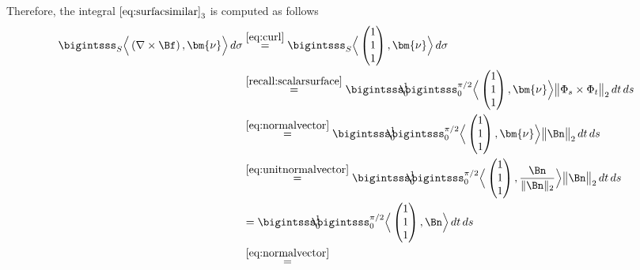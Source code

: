 \documentclass[12pt]{article}
\begin{document}
\begin{enumerate}[(i)]
	      Therefore, the integral $\eqref{eq:surfacsimilar}_{3}$
	      is computed as follows
	      \begin{align}
		      \bigintsss_{S} \Big\langle \left( \nabla \times \Bf \right), \bm{\nu} \Big\rangle \, d\sigma
		       & 
		      \stackrel{\eqref{eq:curl}}{=}
		      \bigintsss_{S} \Big\langle \begin{pmatrix} 1\\1\\1\end{pmatrix}, \bm{\nu} \Big\rangle \, d\sigma \\
		       & 
		      \stackrel{\eqref{recall:scalarsurface}}{=}
		      \bigintsss_{0}^{1} \!\!\!\!\! \bigintsss_{0}^{\pi/2}
		      \Big\langle \begin{pmatrix} 1\\1\\1\end{pmatrix}, \bm{\nu} \Big\rangle 
		      \big\| \Phi_s \times \Phi_t \big\|_2 \, dt \,ds                                                  \\
		       & 
		      \stackrel{\eqref{eq:normalvector}}{=}
		      \bigintsss_{0}^{1} \!\!\!\!\! \bigintsss_{0}^{\pi/2}
		      \Big\langle \begin{pmatrix} 1\\1\\1\end{pmatrix}, \bm{\nu} \Big\rangle 
		      \big\| \Bn \big\|_2 \, dt \,ds                                                                   \\
		       & 
		      \stackrel{\eqref{eq:unitnormalvector}}{=}
		      \bigintsss_{0}^{1} \!\!\!\!\! \bigintsss_{0}^{\pi/2}
		      \Big\langle \begin{pmatrix} 1\\1\\1\end{pmatrix}, \frac{\Bn}{\| \Bn \|_2} \Big\rangle 
		      \big\| \Bn \big\|_2 \, dt \,ds                                                                   \\
		       & 
		      =
		      \bigintsss_{0}^{1} \!\!\!\!\! \bigintsss_{0}^{\pi/2}
		      \Big\langle \begin{pmatrix} 1\\1\\1\end{pmatrix}, \Bn \Big\rangle  \, dt \,ds                    \\
		       & 
		      \stackrel{\eqref{eq:normalvector}}{=}

\end{align}
\end{enumerate}
\end{document}

